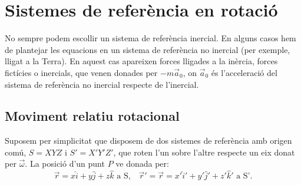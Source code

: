 \chapter{Sistemes de referència en rotació}
No sempre podem escollir un sistema de referència inercial. En alguns casos hem de plantejar les equacions en un sistema de referència no inercial (per exemple, lligat a la Terra). En aquest cas apareixen forces lligades a la inèrcia, forces fictícies o inercials, que venen donades per $-m\vec a_0$, on $\vec a_0$ és l'acceleració del sistema de referència no inercial respecte de l'inercial.
\section{Moviment relatiu rotacional}
Suposem per simplicitat que disposem de dos sistemes de referència amb origen comú, $S=XYZ$ i $S'=X'Y'Z'$, que roten l'un sobre l'altre respecte un eix donat per $\vec\omega$. La posició d'un punt $P$ ve donada per:
\[
\vec r=x\hat i+y\hat j+z\hat k\text{ a S,}\quad
\vec r'=\vec r=x'\hat i'+y'\hat j'+z'\hat k'\text{ a S'}.
\]
